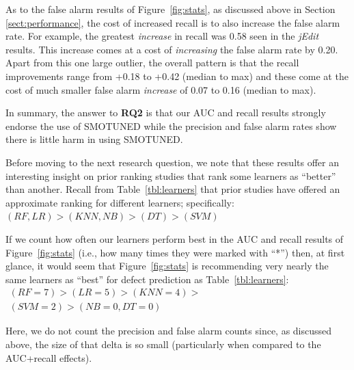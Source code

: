 \documentclass[sigconf,review, anonymous]{acmart}
\theoremstyle{break}
\theoremstyle{break}
\newcommand{\tion}[1]{{Section }\ref{sect:#1}}
\newcommand{\smb}{{\sc SMOTUNED}}
\begin{document}
As to the false alarm results of Figure~\ref{fig:stats}, as discussed above in \tion{performance}, the cost of increased recall is to also increase
the false alarm rate. For example, the greatest \textit{increase} in recall was 0.58 seen in the {\em jEdit} results. This increase comes at a cost
of \textit{increasing} the false alarm rate by 0.20. Apart from this one large outlier, the overall pattern is that the recall improvements range from +0.18 to +0.42 (median to max)
and these come at the cost of much smaller false alarm \textit{increase} of 0.07 to 0.16 (median to max). 
 
In summary, the answer to {\bf RQ2} is that our  AUC and recall results strongly endorse the  use of {\smb}
while the precision and false alarm rates
show there is little harm in using {\smb}.

Before moving to the next research question, we note that these
 results offer an interesting insight on prior ranking studies that rank some learners
as ``better'' than another.
Recall from Table~\ref{tbl:learners} that prior studies have offered an approximate ranking for different learners; specifically: $
(\mathit{RF},\mathit{LR}) > (\mathit{KNN},\mathit{NB}) > (\mathit{DT}) > (\mathit{SVM})$

If we count how often our learners perform
best in the AUC and recall results of Figure~\ref{fig:stats} (i.e., how many times they were marked with ``*'') then, at first
glance, it would seem that Figure~\ref{fig:stats} is recommending very nearly the same
learners as ``best'' for defect prediction as   Table~\ref{tbl:learners}: $\begin{array}{c}
(\mathit{RF}=7) > (\mathit{LR}=5) > (\mathit{KNN}=4) >\\
(\mathit{SVM}=2) > (\mathit{NB}=0, \mathit{DT}=0)
\end{array}$

Here, we do not count  the precision and false alarm counts since, as discussed above, the size
of that delta is so small (particularly when compared to the AUC+recall effects).


\end{document}
